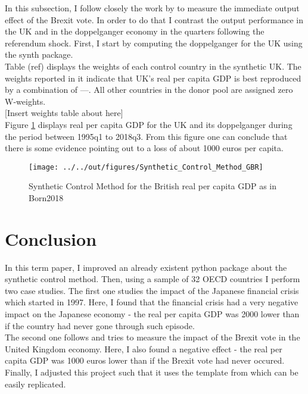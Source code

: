\documentclass[11pt, a4paper, leqno]{article}
\begin{document}
In this subsection, I follow closely the work by \citet{Born2018} to measure the immediate output effect of the Brexit vote. In order to do
that I contrast the output performance in the UK and in the doppelganger economy in the quarters following the referendum shock. First, I start by computing the doppelganger for the UK using the synth package.\\

Table (ref) displays the weights of each control country in the synthetic UK. The weights reported in it indicate that UK's real per capita GDP is best reproduced by a combination of ---. All other countries in the donor pool are assigned zero W-weights.\\

[Insert weights table about here]\\

Figure \ref{GBR} displays real per capita GDP for the UK and its doppelganger during the period between 1995q1 to 2018q3. From this figure one can conclude that there is some evidence pointing out to a loss of about 1000 euros per capita. \\

\begin{figure}[!htbp]
    \caption{Synthetic Control Method for the British real per capita GDP as in Born2018}
    \texttt{[image: ../../out/figures/Synthetic\_Control\_Method\_GBR]}
    \label{GBR}
\end{figure}

\clearpage 
\section{Conclusion}
In this term paper, I improved an already existent python package about the synthetic control method. Then, using a sample of 32 OECD countries I perform two case studies. The first one studies the impact of the Japanese financial crisis which started in 1997. Here, I found that the financial crisis had a very negative impact on the Japanese economy - the real per capita GDP was 2000 lower than if the country had never gone through such episode.\\

The second one follows \citet{Born2018} and tries to measure the impact of the Brexit vote in the United Kingdom economy. Here, I also found a negative effect - the real per capita GDP was 1000 euros lower than if the Brexit vote had never occured.\\

Finally, I adjusted this project such that it uses the template from \citet{GaudeckerEconProjectTemplates} which can be easily replicated.

\clearpage



\end{document}
